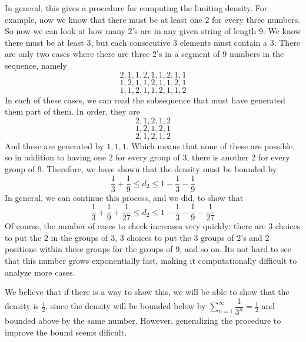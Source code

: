 \documentclass[runningheads,a4paper]{llncs}
\begin{document}
In general, this gives a procedure for computing the limiting density. For example, now we know that there must be at least one $2$ for every three numbers. So now we can look at how many $2$'s are in any given string of length $9$. We know there must be at least $3$, but each consecutive $3$ elements must contain a $3$. There are only two cases where there are three 2's in a segment of $9$ numbers in the sequence, namely
\[ 2, 1, 1, 2, 1, 1 ,2 , 1, 1 \]
\[ 1, 2, 1, 1, 2, 1, 1, 2, 1 \]
\[ 1, 1, 2, 1, 1, 2, 1, 1, 2 \]
In each of these cases, we can read the subsequence that must have generated them part of them. In order, they are
\[ 2, 1, 2, 1, 2 \]
\[ 1, 2, 1, 2, 1\]
\[ 2, 1, 2, 1, 2 \]
And these are generated by $1, 1, 1$. Which means that none of these are possible, so in addition to having one 2 for every group of 3, there is another 2 for every group of 9. Therefore, we have shown that the density must be bounded by
\[ \dfrac{1}{3} + \dfrac{1}{9} \leq d_2 \leq 1 - \dfrac{1}{3} - \dfrac{1}{9} \]
In general, we can continue this process, and we did, to show that
\[ \dfrac{1}{3} + \dfrac{1}{9} + \dfrac{1}{27} \leq d_2 \leq 1 - \dfrac{1}{3} - \dfrac{1}{9} - \dfrac{1}{27} \]
Of course, the number of cases to check increases very quickly: there are $3$ choices to put the $2$ in the groups of $3$, $3$ choices to put the 3 groups of 2's and 2 positions within these groups for the groups of 9, and so on. Its not hard to see that this number grows exponentially fast, making it computationally difficult to analyze more cases.

We believe that if there is a way to show this, we will be able to show that the density is $\frac{1}{2}$, since the density will be bounded below by $\sum_{n=1}^\infty \dfrac{1}{3^n} = \frac{1}{2}$ and bounded above by the same number. However, generalizing the procedure to improve the bound seems dificult.   
\end{document}
